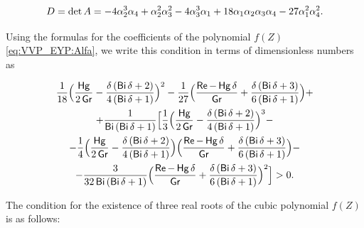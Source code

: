 $$

D=\mathop{\rm det} A=-4\alpha^3_2\alpha_4+\alpha^2_2\alpha^2_3-4\alpha^3_3\alpha_1+18\alpha_1\alpha_2\alpha_3\alpha_4-27\alpha^2_1\alpha^2_4.

$$

Using the formulas for the coefficients of the polynomial $f(Z)$ \eqref{eq:VVP_EYP:Alfa}, we write this condition in terms of dimensionless numbers as

\begin{multline}

\frac{1}{18} \Bigl(\frac{\mathop{\sf Hg}}{2 \mathop{\sf Gr}}-\frac{\delta \left(\mathop{\sf Bi}\delta+2\right)}{4\left(\mathop{\sf Bi}\delta+1\right)}\Bigr)^2-

\frac{1}{27} 

\Bigl(\frac{\mathop{\sf Re}-\mathop{\sf Hg}\delta}{\mathop{\sf Gr}}+

\frac{\delta \left(\mathop{\sf Bi}\delta+3\right)}{6\left(\mathop{\sf Bi}\delta+1\right)}\Bigr)+

\\

+\frac{1}{\mathop{\sf Bi}\left(\mathop{\sf Bi}\delta+1\right)}\Bigl[ \frac{1}{3} \Bigl(\frac{\mathop{\sf Hg}}{2\mathop{\sf Gr}} -\frac{\delta \left(\mathop{\sf Bi}\delta+2\right)}{4\left(\mathop{\sf Bi}\delta+1\right)}\Bigr)^3 -

\\

- \frac{1}{4} \Bigl(\frac{\mathop{\sf Hg}}{2 \mathop{\sf Gr}}-\frac{\delta \left(\mathop{\sf Bi}\delta+2\right)}{4\left(\mathop{\sf Bi}\delta+1\right)}\Bigr) 

\Bigl(\frac{\mathop{\sf Re}- \mathop{\sf Hg}\delta}{\mathop{\sf Gr}}+\frac{\delta \left(\mathop{\sf Bi}\delta+3\right)}{6\left(\mathop{\sf Bi}\delta+1\right)}\Bigr)- 

\\

-\frac{3}{32 \mathop{\sf Bi}\left(\mathop{\sf Bi}\delta+1\right)}  

\Bigl(\frac{\mathop{\sf Re}- \mathop{\sf Hg}\delta}{\mathop{\sf Gr}}+

\frac{\delta \left(\mathop{\sf Bi}\delta+3\right)}{6\left(\mathop{\sf Bi}\delta+1\right)}\Bigr)^2 \Bigr]>0.

\end{multline}

The condition for the existence of three real roots of the cubic polynomial $f(Z)$ is as follows:

$$

